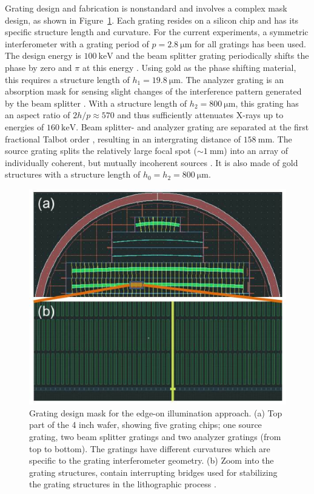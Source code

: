 \documentclass[aip,apl,amsmath,amssymb,floatfix,reprint,a4paper]{revtex4-1}
\begin{document}
Grating design and fabrication is nonstandard and involves a complex mask
design, as shown in Figure~\ref{Fig:grating_mask}. Each grating resides on a
silicon chip and has its specific structure length and curvature. For the
current experiments, a symmetric interferometer with a grating period of $p
= \SI{2.8}{\micro\metre}$ for all gratings has been used. The design energy
is $\SI{100}{\kilo\electronvolt}$ and the beam splitter grating periodically
shifts the phase by zero and $\pi$ at this energy \cite{David2002}. Using
gold as the phase shifting material, this requires a structure length of
$h_1 = \SI{19.8}{\micro \metre}$. The analyzer grating is an absorption mask
for sensing slight changes of the interference pattern generated by the beam
splitter \cite{Momose2003a}. With a structure length of $h_2 =
\SI{800}{\micro \metre}$, this grating has an aspect ratio of $2h/p \approx
570$ and thus sufficiently attenuates X-rays up to energies of 
$\SI{160}{\kilo\electronvolt}$. Beam splitter- and analyzer grating are
separated at the first fractional Talbot order \cite{Weitkamp2005},
resulting in an intergrating distance of $\SI{158}{\milli\metre}$. The
source grating splits the relatively large focal spot ($\sim
\SI{1}{\milli\metre}$) into an array of individually coherent, but mutually
incoherent sources \cite{Pfeiffer2006}. It is also made of gold structures
with a structure length of $h_0 = h_2 = \SI{800}{\micro \metre}$.
\begin{figure} [ht]
    \includegraphics[width=\linewidth]{figures/grating_mask.eps}
    \caption{Grating design mask for
        the edge-on illumination approach. (a) Top part of the 4 inch wafer,
        showing five grating chips; one source grating, two beam splitter
        gratings and two analyzer gratings (from top to bottom). The
        gratings have different curvatures which are specific to the grating
        interferometer geometry. (b) Zoom into the grating structures,
        contain interrupting bridges used for stabilizing the grating
        structures in the lithographic process \cite{Kenntner2010}.}
        \label{Fig:grating_mask}
\end{figure}
\end{document}
